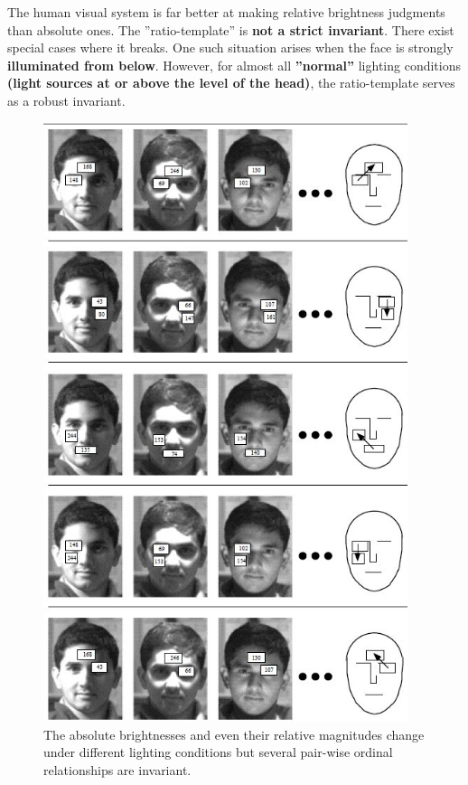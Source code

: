 \documentclass[a4paper,12pt]{article}
\begin{document}
The human visual system is far better at making relative brightness judgments than absolute ones. 
The ''ratio-template'' is \textbf{not a strict invariant}. There exist special cases where it breaks. 
One such situation arises when the face is strongly \textbf{illuminated from below}.
However, for almost all \textbf{''normal''} lighting conditions \textbf{(light sources at or above the level of the head)}, the ratio-template serves as a robust invariant. \cite{Sinha:2002:QRR:648248.751730}

\begin{figure}[ht]
  \centering
  \includegraphics[width=0.95\textwidth, keepaspectratio=true]{face-pair-wise-ordinal.jpg}
  \caption{The absolute brightnesses and even their relative magnitudes change under 
  different lighting conditions but several pair-wise ordinal relationships are invariant. \cite{Sinha:2002:QRR:648248.751730}}
 \label{fig:face-pair-wise-ordinal}
\end{figure}
\end{document}
